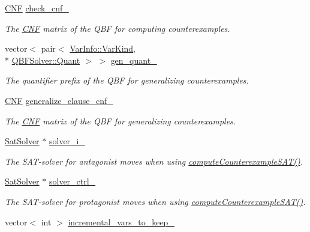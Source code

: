 \begin{DoxyCompactItemize}
\hyperlink{classCNF}{C\-N\-F} \hyperlink{classLearnSynthQBF_afe20b32b1b8c07a237322825c91a36f0}{check\-\_\-cnf\-\_\-}
\begin{DoxyCompactList}\small\item\em The \hyperlink{classCNF}{C\-N\-F} matrix of the Q\-B\-F for computing counterexamples. \end{DoxyCompactList}\item 
vector$<$ pair$<$ \hyperlink{classVarInfo_a64d1da76cf84fe674e5fef9764ef11cf}{Var\-Info\-::\-Var\-Kind}, \\*
\hyperlink{classQBFSolver_ac091e263cb55286cc07b2451bcf4d3c7}{Q\-B\-F\-Solver\-::\-Quant} $>$ $>$ \hyperlink{classLearnSynthQBF_a2a6687cca6f45b9684d3bd6e7cc8c20c}{gen\-\_\-quant\-\_\-}
\begin{DoxyCompactList}\small\item\em The quantifier prefix of the Q\-B\-F for generalizing counterexamples. \end{DoxyCompactList}\item 
\hyperlink{classCNF}{C\-N\-F} \hyperlink{classLearnSynthQBF_adb0678a7c034958c31bd5d92615e9859}{generalize\-\_\-clause\-\_\-cnf\-\_\-}
\begin{DoxyCompactList}\small\item\em The \hyperlink{classCNF}{C\-N\-F} matrix of the Q\-B\-F for generalizing counterexamples. \end{DoxyCompactList}\item 
\hyperlink{classSatSolver}{Sat\-Solver} $\ast$ \hyperlink{classLearnSynthQBF_ada2e8c87c0ca0d83c484d6181ea5a788}{solver\-\_\-i\-\_\-}
\begin{DoxyCompactList}\small\item\em The S\-A\-T-\/solver for antagonist moves when using \hyperlink{classLearnSynthQBF_a3221800bf3f040b66b8a790bab4c82b5}{compute\-Counterexample\-S\-A\-T()}. \end{DoxyCompactList}\item 
\hyperlink{classSatSolver}{Sat\-Solver} $\ast$ \hyperlink{classLearnSynthQBF_a14f20d46129ad1fe2db8272348a7e589}{solver\-\_\-ctrl\-\_\-}
\begin{DoxyCompactList}\small\item\em The S\-A\-T-\/solver for protagonist moves when using \hyperlink{classLearnSynthQBF_a3221800bf3f040b66b8a790bab4c82b5}{compute\-Counterexample\-S\-A\-T()}. \end{DoxyCompactList}\item 
vector$<$ int $>$ \hyperlink{classLearnSynthQBF_a227ff215ffb411e57686aa3d8e7f7026}{incremental\-\_\-vars\-\_\-to\-\_\-keep\-\_\-}

\end{DoxyCompactItemize}
